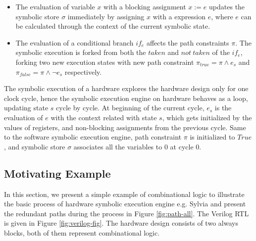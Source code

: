 \documentclass[conference]{IEEEtran}
\begin{document}
\begin{itemize}[itemsep=2pt, topsep=0pt, parsep=1pt]
    \item The evaluation of variable $x$ with a blocking assignment $x := e$ updates the symbolic store $\sigma$ immediately by assigning $x$ with a expression $e$, where $e$ can be calculated through the context of the current symbolic state. 
    \item The evaluation of a conditional branch $if_e$ affects the path constraints $\pi$. The symbolic execution is forked from both the $taken$ and $not\ taken$ of the $if_e$, forking two new execution states with new path constraint $\pi_{true} = \pi \land e_s$ and $\pi_{false}=\pi \land \lnot e_s$ respectively. 
\end{itemize}

The symbolic execution of a hardware explores the hardware design only for one clock cycle, hence the symbolic execution engine on hardware behaves as a loop, updating state $s$ cycle by cycle. At beginning of the current cycle,  $e_s$ is the evaluation of $e$ with the context related with state $s$, which gets initialized by the values of registers, and non-blocking assignments from the previous cycle.
Same to the software symbolic execution engine, path constraint $\pi$ is initialized to $True$, and symbolic store $\sigma$ associates all the variables to 0 at cycle 0. 

\vspace{-3mm}
\subsection{Motivating Example}
In this section, we present a simple example of combinational logic to illustrate the basic process of hardware symbolic execution engine e.g. Sylvia and present the redundant paths during the process in Figure \ref{fig:path-all}. The Verilog RTL is given in Figure \ref{fig:verilog-fig}. The hardware design consists of two always blocks, both of them represent combinational logic. 
\end{document}
